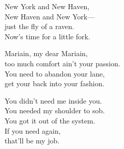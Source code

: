 \begin{lyrics}
New York and New Haven,\\
New Haven and New York—\\
just the fly of a raven.\\
Now's time for a little fork.

Mariain, my dear Mariain,\\
too much comfort ain't your passion.\\
You need to abandon your lane,\\
get your back into your fashion.

You didn't need me inside you.\\
You needed my shoulder to sob.\\
You got it out of the system.\\
If you need again,\\
that'll be my job.
\end{lyrics}


